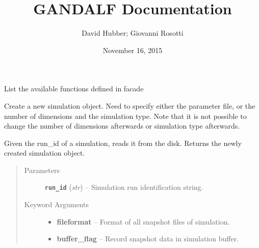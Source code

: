 \documentclass[letterpaper,10pt,english]{sphinxmanual}
\title{GANDALF Documentation}
\date{November 16, 2015}
\author{David Hubber; Giovanni Rosotti}
\begin{document}
\maketitle
\tableofcontents
{}\label{index::doc}\label{index:module-facade}

\begin{fulllineitems}
\label{index:facade.ListFunctions}
List the available functions defined in facade

\end{fulllineitems}


\begin{fulllineitems}
\label{index:facade.newsim}
Create a new simulation object. Need to specify either the parameter
file, or the number of dimensions and the simulation type. Note that it is not
possible to change the number of dimensions afterwards or simulation type
afterwards.

\end{fulllineitems}


\begin{fulllineitems}
\label{index:facade.loadsim}
Given the run\_id of a simulation, reads it from the disk.
Returns the newly created simulation object.
\begin{quote}\begin{description}
\item[{Parameters}] \leavevmode
\textbf{\texttt{run\_id}} (\emph{str}) -- Simulation run identification string.

\item[{Keyword Arguments}] \leavevmode\begin{itemize}
\item {} 
\textbf{fileformat} --
Format of all snapshot files of simulation.

\item {} 
\textbf{buffer\_flag} --
Record snapshot data in simulation buffer.

\end{itemize}

\end{description}\end{quote}

\end{fulllineitems}
\end{document}
